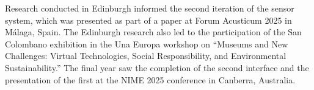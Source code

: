 Research conducted in Edinburgh informed the second iteration of the sensor system, which was presented as part of a paper at Forum Acusticum 2025 in Málaga, Spain. The Edinburgh research also led to the participation of the San Colombano exhibition in the Una Europa workshop on ``Museums and New Challenges: Virtual Technologies, Social Responsibility, and Environmental Sustainability.'' The final year saw the completion of the second interface and the presentation of the first at the NIME 2025 conference in Canberra, Australia.


\clearpage



